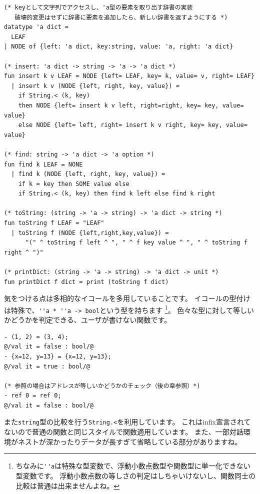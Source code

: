 \documentclass[11pt,a4paper]{article}
\begin{document}
\begin{lstlisting}[caption=２分探索木による辞書の実装,label=code:dict]
(* keyとして文字列でアクセスし、'a型の要素を取り出す辞書の実装
   破壊的変更はせずに辞書に要素を追加したら、新しい辞書を返すようにする *)
datatype 'a dict =
  LEAF
| NODE of {left: 'a dict, key:string, value: 'a, right: 'a dict}

(* insert: 'a dict -> string -> 'a -> 'a dict *)
fun insert k v LEAF = NODE {left= LEAF, key= k, value= v, right= LEAF}
  | insert k v (NODE {left, right, key, value}) =
    if String.< (k, key)
    then NODE {left= insert k v left, right=right, key= key, value= value}
    else NODE {left= left, right= insert k v right, key= key, value= value}

(* find: string -> 'a dict -> 'a option *)
fun find k LEAF = NONE
  | find k (NODE {left, right, key, value}) =
    if k = key then SOME value else
    if String.< (k, key) then find k left else find k right

(* toString: (string -> 'a -> string) -> 'a dict -> string *)
fun toString f LEAF = "LEAF"
  | toString f (NODE {left,right,key,value}) =
      "(" ^ toString f left ^ ", " ^ f key value ^ ", " ^ toString f right ^ ")"

(* printDict: (string -> 'a -> string) -> 'a dict -> unit *)
fun printDict f dict = print (toString f dict)
\end{lstlisting}


気をつける点は多相的なイコールを多用していることです。
イコールの型付けは特殊で、\lstinline{''a * ''a -> bool}という型を持ちます
\footnote{ちなみに\lstinline{''a}は特殊な型変数で、浮動小数点数型や関数型に単一化できない型変数です。
浮動小数点数の等しさの判定はしちゃいけないし、関数同士の比較は普通は出来ませんよね。}。
色々な型に対して等しいかどうかを判定できる、ユーザが書けない関数です。

\begin{lstlisting}[caption=イコールを乱用する,label=code:equal]
- (1, 2) = (3, 4);
@/val it = false : bool/@
- {x=12, y=13} = {x=12, y=13};
@/val it = true : bool/@

(* 参照の場合はアドレスが等しいかどうかのチェック（後の章参照）*)
- ref 0 = ref 0;
@/val it = false : bool/@
\end{lstlisting}

また\lstinline{string}型の比較を行う\lstinline{String.<}を利用しています。
これはinfix宣言されてないので普通の関数と同じスタイルで関数適用しています。
また、一部対話環境がネストが深かったりデータが長すぎて省略している部分がありますね。
\end{document}
